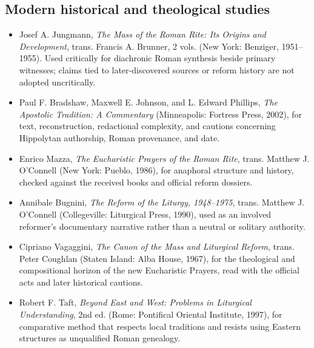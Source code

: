 \subsection{Modern historical and theological studies}

\begin{itemize}[nosep]
  \item Josef A. Jungmann, \emph{The Mass of the Roman Rite: Its Origins and Development}, trans. Francis A. Brunner, 2 vols. (New York: Benziger, 1951--1955). Used critically for diachronic Roman synthesis beside primary witnesses; claims tied to later-discovered sources or reform history are not adopted uncritically.
  \item Paul F. Bradshaw, Maxwell E. Johnson, and L. Edward Phillips, \emph{The Apostolic Tradition: A Commentary} (Minneapolis: Fortress Press, 2002), for text, reconstruction, redactional complexity, and cautions concerning Hippolytan authorship, Roman provenance, and date.
  \item Enrico Mazza, \emph{The Eucharistic Prayers of the Roman Rite}, trans. Matthew J. O'Connell (New York: Pueblo, 1986), for anaphoral structure and history, checked against the received books and official reform dossiers.
  \item Annibale Bugnini, \emph{The Reform of the Liturgy, 1948--1975}, trans. Matthew J. O'Connell (Collegeville: Liturgical Press, 1990), used as an involved reformer's documentary narrative rather than a neutral or solitary authority.
  \item Cipriano Vagaggini, \emph{The Canon of the Mass and Liturgical Reform}, trans. Peter Coughlan (Staten Island: Alba House, 1967), for the theological and compositional horizon of the new Eucharistic Prayers, read with the official acts and later historical cautions.
  \item Robert F. Taft, \emph{Beyond East and West: Problems in Liturgical Understanding}, 2nd ed. (Rome: Pontifical Oriental Institute, 1997), for comparative method that respects local traditions and resists using Eastern structures as unqualified Roman genealogy.
\end{itemize}

\endgroup
